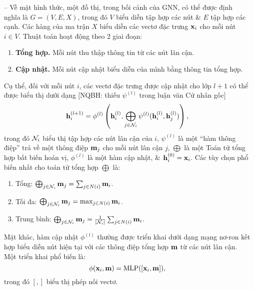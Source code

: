 \documentclass{article}
\begin{document}
\begin{itemize}
\begin{itemize}
        -- Về mặt hình thức, một đồ thị, trong bối cảnh của GNN, có thể được định nghĩa là $G = (V,E,X)$, trong đó $V$ biểu diễn tập hợp các nút \& $E$ tập hợp các cạnh. Các hàng của ma trận $X$ biểu diễn các vectơ đặc trưng ${\bf x}_i$ cho mỗi nút $i\in V$. Thuật toán hoạt động theo 2 giai đoạn:

        \begin{enumerate}

            \item {\bf Tổng hợp.} Mỗi nút thu thập thông tin từ các nút lân cận.


            \item {\bf Cập nhật.} Mỗi nút cập nhật biểu diễn của mình bằng thông tin tổng hợp.

        \end{enumerate}
        Cụ thể, đối với mỗi nút $i$, các vectơ đặc trưng được cập nhật cho lớp $l + 1$ có thể được biểu thị dưới dạng [NQBH: thiếu $\psi^{(l)}$ trong luận văn Cử nhân gốc]
        \begin{equation*}
            {\bf h}_i^{(l + 1)} = \phi^{(l)}\left({\bf h}_i^{(l)},\bigoplus_{j\in{\cal N}_i} \psi^{(l)}({\bf h}_i^{(l)},{\bf h}_j^{(l)})\right),
        \end{equation*}
        trong đó ${\cal N}_i$ biểu thị tập hợp các nút lân cận của $i$, $\psi^{(l)}$ là một ``hàm thông điệp'' trả về một thông điệp ${\bf m}_j$ cho mỗi nút lân cận $j$, $\bigoplus$ là một Toán tử tổng hợp bất biến hoán vị, $\phi^{(l)}$ là một hàm cập nhật, \& ${\bf h}_i^{(0)} = {\bf x}_i$. Các tùy chọn phổ biến nhất cho toán tử tổng hợp $\bigoplus$ là:
        \begin{enumerate}
            \item Tổng: $\bigoplus_{j\in{\cal N}_i} {\bf m}_j = \sum_{j\in N(i)} {\bf m}_i$.
            \item Tối đa: $\bigoplus_{j\in{\cal N}_i} {\bf m}_j = \max_{j\in N(i)} {\bf m}_i$.
            \item Trung bình: $\bigoplus_{j\in{\cal N}_i} {\bf m}_j = \frac{1}{|{\cal N}_i|}\sum_{j\in N(i)} {\bf m}_i$.
        \end{enumerate}
        Mặt khác, hàm cập nhật $\phi^{(l)}$ thường được triển khai dưới dạng mạng nơ-ron kết hợp biểu diễn nút hiện tại với các thông điệp tổng hợp ${\bf m}$ từ các nút lân cận. Một triển khai phổ biến là:
        \begin{equation*}
            \phi({\bf x}_i,{\bf m}) = {\rm MLP}([{\bf x}_i,{\bf m}]),
        \end{equation*}
        trong đó $[,]$ biểu thị phép nối vectơ.


\end{itemize}
\end{itemize}
\end{document}
